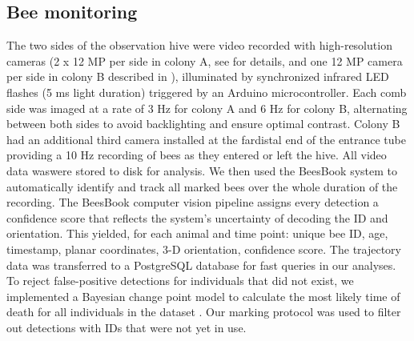 \documentclass{article}
\newcommand{\added}[1]{{\color{blue}#1}}
\newcommand{\deleted}[1]{{\color{red}#1}} %
\newcommand{\replaced}[2]{\deleted{#1}\added{#2}}
\newcommand{\added}[1]{#1}
\newcommand{\deleted}[1]{}
\newcommand{\replaced}[2]{#2}
\begin{document}
\subsection*{Bee monitoring}
The two sides of the observation hive were video recorded with high-resolution cameras (2 x 12 MP per side in colony A, see \cite{wario_automatic_2015} for details, and one 12 MP camera per side in colony B described in \cite{wild_social_2021}), illuminated by synchronized infrared LED flashes (5 ms light duration) triggered by an Arduino microcontroller. Each comb side was imaged at a rate of 3 Hz for colony A and 6 Hz for colony B, alternating between both sides to avoid backlighting and ensure optimal contrast. Colony B had an additional third camera installed at the \replaced{far}{distal} end of the entrance tube providing a 10 Hz recording of bees as they entered or left the hive. All video data \replaced{was}{were} stored to disk for analysis. We then used the BeesBook system \cite{wario_automatic_2015, wario_automatic_2017, sixt_rendergan:_2018, wild_automatic_2018, boenisch_tracking_2018, wild_social_2021, dormagen_machine_2023} to automatically identify and track all marked bees over the whole duration of the recording. The BeesBook computer vision pipeline assigns every detection a confidence score that reflects the system’s uncertainty of decoding the ID and orientation. This yielded, for each animal and time point: unique bee ID, age, timestamp, planar coordinates, 3-D orientation\added{, confidence score}. The trajectory data was transferred to a PostgreSQL database for fast queries in our analyses. To reject false-positive detections for individuals that did not exist, we implemented a Bayesian change point model to calculate the most likely time of death for all individuals in the dataset \cite{wild_social_2021}. Our marking protocol was used to filter out detections with IDs that were not yet in use.
\end{document}
